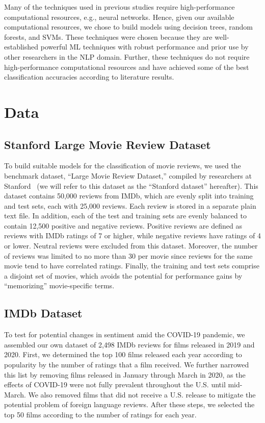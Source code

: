 \documentclass[conference]{IEEEtran}
\begin{document}
Many of the techniques used in previous studies require high-performance computational resources, e.g., neural networks. Hence, given our available computational resources, we chose to build models using decision trees, random forests, and SVMs. These techniques were chosen because they are well-established powerful ML techniques with robust performance and prior use by other researchers in the NLP domain. Further, these techniques do not require high-performance computational resources and have achieved some of the best classification accuracies according to literature results.

\section{Data}\label{sec:Data}

\subsection{Stanford Large Movie Review Dataset}\label{sec:Stanford}
To build suitable models for the classification of movie reviews, we used the benchmark dataset, ``Large Movie Review Dataset,'' compiled by researchers at Stanford~\cite{ref:MaasDataset, ref:MaasPaper} (we will refer to this dataset as the ``Stanford dataset'' hereafter). This dataset contains 50,000 reviews from IMDb, which are evenly split into training and test sets, each with 25,000 reviews. Each review is stored in a separate plain text file. In addition, each of the test and training sets are evenly balanced to contain 12,500 positive and negative reviews. Positive reviews are defined as reviews with IMDb ratings of 7 or higher, while negative reviews have ratings of 4 or lower. Neutral reviews were excluded from this dataset. Moreover, the number of reviews was limited to no more than 30 per movie since reviews for the same movie tend to have correlated ratings. Finally, the training and test sets comprise a disjoint set of movies, which avoids the potential for performance gains by ``memorizing'' movie-specific terms.

\subsection{IMDb Dataset}\label{sec:IMDb}
To test for potential changes in sentiment amid the COVID-19 pandemic, we assembled our own dataset of 2,498 IMDb reviews for films released in 2019 and 2020. First, we determined the top 100 films released each year according to popularity by the number of ratings that a film received. We further narrowed this list by removing films released in January through March in 2020, as the effects of COVID-19 were not fully prevalent throughout the U.S. until mid-March. We also removed films that did not receive a U.S. release to mitigate the potential problem of foreign language reviews. After these steps, we selected the top 50 films according to the number of ratings for each year.
\end{document}
